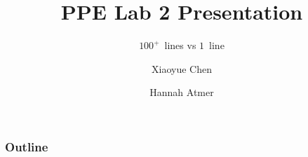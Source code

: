 \documentclass{beamer}
\title{PPE Lab 2 Presentation}
\subtitle{\(100^{+}\)~lines vs \(1\)~line}
\author{Xiaoyue Chen \and Hannah Atmer}
\begin{document}
\begin{frame}
  \titlepage{}
\end{frame}

\begin{frame}
  \frametitle{Outline}
  \tableofcontents[pausesections]
\end{frame}





\end{document}
